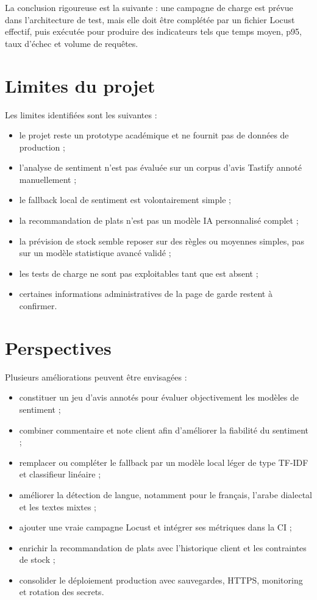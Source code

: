 La conclusion rigoureuse est la suivante : une campagne de charge est prévue dans l'architecture de test, mais elle doit être complétée par un fichier Locust effectif, puis exécutée pour produire des indicateurs tels que temps moyen, p95, taux d'échec et volume de requêtes.

\section{Limites du projet}
Les limites identifiées sont les suivantes :

\begin{itemize}
  \item le projet reste un prototype académique et ne fournit pas de données de production ;
  \item l'analyse de sentiment n'est pas évaluée sur un corpus d'avis Tastify annoté manuellement ;
  \item le fallback local de sentiment est volontairement simple ;
  \item la recommandation de plats n'est pas un modèle IA personnalisé complet ;
  \item la prévision de stock semble reposer sur des règles ou moyennes simples, pas sur un modèle statistique avancé validé ;
  \item les tests de charge ne sont pas exploitables tant que  est absent ;
  \item certaines informations administratives de la page de garde restent à confirmer.
\end{itemize}

\section{Perspectives}
Plusieurs améliorations peuvent être envisagées :

\begin{itemize}
  \item constituer un jeu d'avis annotés pour évaluer objectivement les modèles de sentiment ;
  \item combiner commentaire et note client afin d'améliorer la fiabilité du sentiment ;
  \item remplacer ou compléter le fallback par un modèle local léger de type TF-IDF et classifieur linéaire ;
  \item améliorer la détection de langue, notamment pour le français, l'arabe dialectal et les textes mixtes ;
  \item ajouter une vraie campagne Locust et intégrer ses métriques dans la CI ;
  \item enrichir la recommandation de plats avec l'historique client et les contraintes de stock ;
  \item consolider le déploiement production avec sauvegardes, HTTPS, monitoring et rotation des secrets.
\end{itemize}


